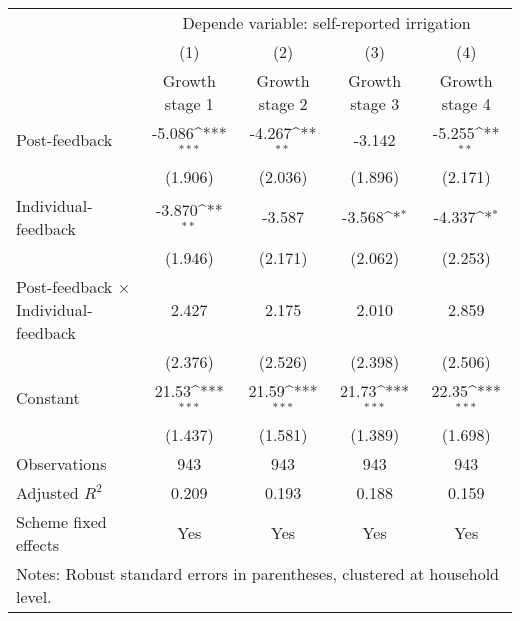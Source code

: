 {
\def\sym#1{\ifmmode^{#1}\else\(^{#1}\)\fi}
\begin{tabular}{l*{4}{c}}
\hline\hline
                    &\multicolumn{4}{c}{Depende variable: self-reported irrigation}                         \\\cmidrule(lr){2-5}
                    &\multicolumn{1}{c}{(1)}&\multicolumn{1}{c}{(2)}&\multicolumn{1}{c}{(3)}&\multicolumn{1}{c}{(4)}\\
                    &\multicolumn{1}{c}{Growth stage 1}&\multicolumn{1}{c}{Growth stage 2}&\multicolumn{1}{c}{Growth stage 3}&\multicolumn{1}{c}{Growth stage 4}\\
\hline
Post-feedback       &      -5.086\sym{***}&      -4.267\sym{**} &      -3.142         &      -5.255\sym{**} \\
                    &     (1.906)         &     (2.036)         &     (1.896)         &     (2.171)         \\
[1em]
Individual-feedback &      -3.870\sym{**} &      -3.587         &      -3.568\sym{*}  &      -4.337\sym{*}  \\
                    &     (1.946)         &     (2.171)         &     (2.062)         &     (2.253)         \\
[1em]
Post-feedback $\times$ Individual-feedback&       2.427         &       2.175         &       2.010         &       2.859         \\
                    &     (2.376)         &     (2.526)         &     (2.398)         &     (2.506)         \\
[1em]
Constant            &       21.53\sym{***}&       21.59\sym{***}&       21.73\sym{***}&       22.35\sym{***}\\
                    &     (1.437)         &     (1.581)         &     (1.389)         &     (1.698)         \\
\hline
Observations        &         943         &         943         &         943         &         943         \\
Adjusted \(R^{2}\)  &       0.209         &       0.193         &       0.188         &       0.159         \\
Scheme fixed effects&         Yes         &         Yes         &         Yes         &         Yes         \\
\hline\hline
\multicolumn{5}{l}{\footnotesize Notes: Robust standard errors in parentheses, clustered at household level.}\\
\end{tabular}
}
